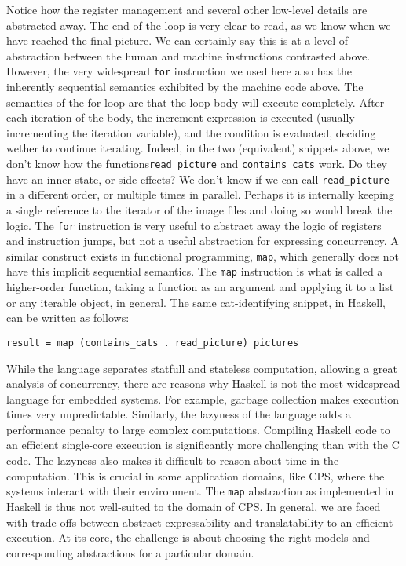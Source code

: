 Notice how the register management and several other low-level details are abstracted away.
The end of the loop is very clear to read, as we know when we have reached the final picture.
We can certainly say this is at a level of abstraction between the human and machine instructions contrasted above.
However, the very widespread \texttt{for} instruction we used here also has the inherently sequential semantics exhibited by the machine code above.
The semantics of the for loop are that the loop body will execute completely.
After each iteration of the body, the increment expression is executed (usually incrementing the iteration variable), and the condition is evaluated, deciding wether to continue iterating.
Indeed, in the two (equivalent) snippets above, we don't know how the functions\texttt{read\_picture} and \texttt{contains\_cats} work.
Do they have an inner state, or side effects?
We don't know if we can call \texttt{read\_picture} in a different order, or multiple times in parallel.
Perhaps it is internally keeping a single reference to the iterator of the image files and doing so would break the logic.
The \texttt{for} instruction is very useful to abstract away the logic of registers and instruction jumps, but not a useful abstraction for expressing concurrency.
A similar construct exists in functional programming, \texttt{map}, which generally does not have this implicit sequential semantics.
The \texttt{map} instruction is what is called a higher-order function, taking a function as an argument and applying it to a list or any iterable object, in general.
The same cat-identifying snippet, in Haskell, can be written as follows:
\begin{verbatim}
result = map (contains_cats . read_picture) pictures
\end{verbatim}

While the language separates statfull and stateless computation, allowing a great analysis of concurrency, there are reasons why Haskell is not the most widespread language for embedded systems.
For example, garbage collection makes execution times very unpredictable.
Similarly, the lazyness of the language adds a performance penalty to large complex computations.
Compiling Haskell code to an efficient single-core execution is significantly more challenging than with the C code.
The lazyness also makes it difficult to reason about time in the computation.
This is crucial in some application domains, like \ac{CPS}, where the systems interact with their environment.
The \texttt{map} abstraction as implemented in Haskell is thus not well-suited to the domain of \ac{CPS}.
In general, we are faced with trade-offs between abstract expressability and translatability to an efficient execution.
At its core, the challenge is about choosing the right models and corresponding abstractions for a particular domain.

